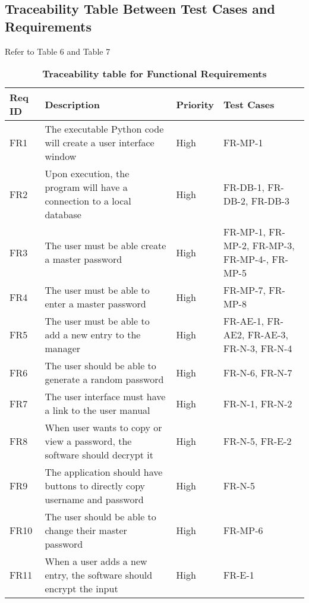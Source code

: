 \documentclass[12pt, titlepage]{article}
\begin{document}
\subsection{Traceability Table Between Test Cases and Requirements}
Refer to Table 6 and Table 7
\begin{table}[!htbp]
    \caption{\textbf{Traceability table for Functional Requirements}} \label{Table}
    \begin{tabularx}{\textwidth}{p{2cm}Xp{2cm}X}
        \toprule
        \textbf{Req ID} & \textbf{Description} & \textbf{Priority} & \textbf{Test Cases}\\
        \midrule
        FR1  & The executable Python code will create a user interface window & High & FR-MP-1\\\hline
        FR2  & Upon execution, the program will have a connection to a local database & High & FR-DB-1, FR-DB-2, FR-DB-3\\\hline
        FR3  & The user must be able create a master password & High & FR-MP-1, FR-MP-2, FR-MP-3, FR-MP-4-, FR-MP-5\\\hline
        FR4  & The user must be able to enter a master password & High & FR-MP-7, FR-MP-8\\\hline
        FR5  & The user must be able to add a new entry to the manager & High & FR-AE-1, FR-AE2, FR-AE-3, FR-N-3, FR-N-4\\\hline
        FR6  & The user should be able to generate a random password  & High & FR-N-6, FR-N-7\\\hline
        FR7  & The user interface must have a link to the user manual & High & FR-N-1, FR-N-2\\\hline
        FR8  & When user wants to copy or view a password, the software should decrypt it & High & FR-N-5, FR-E-2\\\hline
        FR9  & The application should have buttons to directly copy username and password & High & FR-N-5\\\hline
        FR10 & The user should be able to change their master password  & High & FR-MP-6\\\hline
        FR11 & When a user adds a new entry, the software should encrypt the input & High & FR-E-1\\
    
        \bottomrule
    \end{tabularx}
\end{table}
\end{document}
